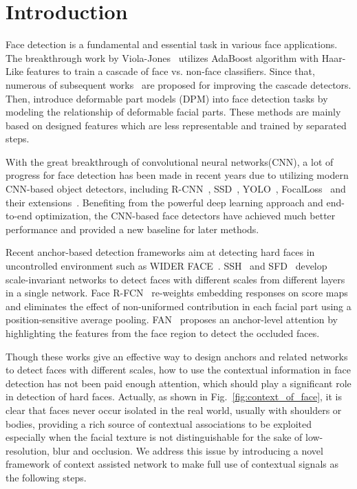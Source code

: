 \documentclass[runningheads]{llncs}
\begin{document}
\section{Introduction}
\label{sec:intro}
Face detection is a fundamental and essential task in various face applications.
The breakthrough work by Viola-Jones~\cite{Viola2004} utilizes AdaBoost algorithm
with Haar-Like features to train a cascade of face vs. non-face classifiers.
Since that, numerous of subsequent
works~\cite{Brubaker2008,Pham2007,Liao2016,Lowe2004,Yang2014,Zhu2006}
are proposed for improving the cascade detectors.
Then, \cite{Mathias2014,Yan2014,Zhu2012} introduce deformable
part models (DPM) into face detection tasks by modeling the relationship of
deformable facial parts. These methods are mainly based on designed features which are less representable and trained by separated steps.

With the great breakthrough of convolutional neural networks(CNN),
a lot of progress for face detection
has been made in recent years due to utilizing modern CNN-based object detectors,
including R-CNN~\cite{Girshick2014,Girshick2016,Girshick2015,Ren2015},
SSD~\cite{Liu2016}, YOLO~\cite{Redmon2016}, FocalLoss~\cite{Lin2017b} and their extensions~\cite{zhang2017single}.
Benefiting from the powerful deep learning approach and end-to-end optimization,
the CNN-based face detectors have achieved much better performance and provided a new baseline for later methods.


Recent anchor-based detection frameworks aim at detecting hard faces in uncontrolled environment such as WIDER FACE~\cite{Barbu14}.
SSH~\cite{Najibi2017} and SFD~\cite{Zhang2017} develop scale-invariant networks to
detect faces with different scales from different layers in a single network.
Face R-FCN~\cite{Wang2017} re-weights embedding responses on score maps and eliminates
the effect of non-uniformed contribution in each facial part using a position-sensitive
average pooling. FAN~\cite{Wang2017b} proposes an anchor-level attention by highlighting the features from
the face region to detect the occluded faces.

Though these works give an effective way to design anchors and related networks to detect faces with different scales,
how to use the contextual information in face detection has not been paid enough attention, which should play a significant role in detection of hard faces.
Actually, as shown in Fig.~\ref{fig:context_of_face}, it is clear that faces never occur isolated in the real world, usually with shoulders or bodies, providing a rich
source of contextual associations to be exploited especially when the facial texture is not distinguishable for the sake of low-resolution, blur and occlusion.
We address this issue by introducing a novel framework of context assisted network to make full use of contextual signals as the following steps.
\end{document}
